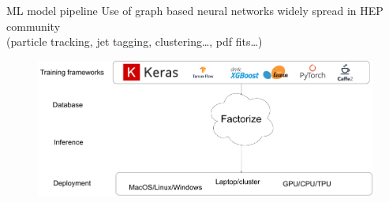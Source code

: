 \documentclass[aspectratio=169,9pt]{beamer}
\begin{document}
\begin{frame}[t]{ML model pipeline}
  Use of graph based neural networks widely spread in HEP community \\
  (particle tracking, jet tagging, clustering\ldots, pdf fits\ldots)\\\vspace*{0.5cm}
  \begin{figure}
    \centering
    \includegraphics[width=.6\textwidth]{factorize_this_workflow.pdf}
  \end{figure}
\end{frame}


\end{document}
